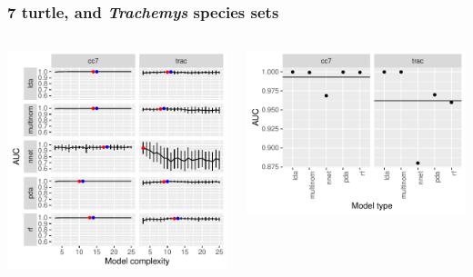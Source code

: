 \documentclass{beamer}
\begin{document}
\begin{frame}
  \frametitle{7 turtle, and \textit{Trachemys} species sets}
  \begin{columns}
    \begin{column}{0.5\textwidth}
      \includegraphics[width=\textwidth,height=0.8\textheight,keepaspectratio=true]{figure/other_model_sel}
    \end{column}
    \begin{column}{0.5\textwidth}
      \includegraphics[width=\textwidth,height=0.8\textheight,keepaspectratio=true]{figure/other_oos_sel}
    \end{column}
  \end{columns}
\end{frame}
\end{document}
